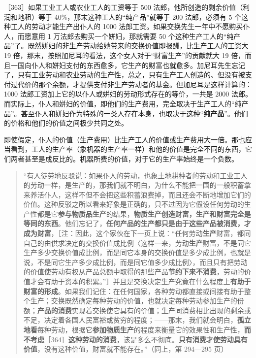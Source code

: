 ［363］如果工业工人或农业工人的工资等于 500 法郎，他所创造的剩余价值（利润和地租）等于 40\%，那末这种工人的“纯产品”就等于 200 法郎，必须有 5 个这种工人的劳动才能生产出仆人的 1000 法郎工资。如果交换先生一年中不愿购买仆人，而愿意用 1 万法郎去购买一个姘妇，那就需要 50 个这种生产工人的“纯产品”了。既然姘妇的非生产劳动给她带来的交换价值即报酬，比生产工人的工资大 19 倍，那末，按照加尼耳的看法，这个女人对于“财富生产”的贡献就大 19 倍，而且一国向仆人和姘妇支付的东西愈多，它生产的财富也就愈多。加尼耳先生忘记了，只有工业劳动和农业劳动的生产性，总之，只有生产工人创造的、但没有被支付过代价的那个余额，才提供支付非生产劳动者的基金。但加尼耳是这样计算的：1000 法郎工资加上它的以仆人或姘妇的劳动形式存在的等价，一共是 2000 法郎。而实际上，仆人和姘妇的价值，即他们的生产费用，完全取决于生产工人的“纯产品”。甚至仆人和姘妇作为特殊的一类人存在本身，也取决于这种“\textbf{纯产品}”。他们的价格和他们的价值之间极少共同之处。

即使假定，仆人的价值（生产费用）比生产工人的价值或生产费用大一倍。那也应当看到，工人的生产率（象机器的生产率一样）和他的价值是完全不同的东西，它们两者甚至是成反比的。机器所费的价值，对于它的生产率始终是一个负数。

\begin{quote}“有人徒劳地反驳说：如果仆人的劳动，也象土地耕种者的劳动和工业工人的劳动一样，是生产的，那我们就不明白，为什么不能把一国的一般积蓄拿来养活仆人，这样不但不会把这些积蓄浪费掉，而且还会不断地增加它们的价值。这种反驳之所以看来好象是正确的，只不过因为它假设任何劳动的生产性都是它\textbf{参与物质品生产}的结果，\textbf{物质生产创造财富，生产和财富完全是等同的东西}。他们忘记了，\textbf{任何产品的生产都只是由于这些产品被消费，才成为财富}，［注：\fontbox{~\{}因此，这个家伙在下一页上说：“任何劳动\textbf{生产}财富，都同自己的由供求决定的交换价值成比例〈这样一来，劳动\textbf{生产}财富，不是同它生产多少交换价值成比例，而是同它本身的交换价值是多少成比例，也就是说，不是同它生产多少成比例，而是同它值多少成比例〉，而且只有把劳动的价值使劳动有权从产品总额中取得的那些产品\textbf{节约下来不消费}，劳动的价值才会有助于资本的积累。”\fontbox{\}~}］并且是交换决定生产究竟在什么程度上\textbf{有助于财富的形成}。如果我们记住：在任何国家，各种劳动都直接或间接有助于整个生产；交换既然确定每种劳动的价值，也就决定每种劳动参加生产的份额；\textbf{产品的消费}实现着交换使它具有的价值；生产同消费相比出现的剩余或不足，决定着各国人民富裕或贫穷的程度；——那末，我们就会明白，\textbf{孤立地看}每种劳动，根据它\textbf{参加物质生产}的程度来衡量它的效果性和生产性，\textbf{而不考虑}［364］\textbf{这种劳动的消费}，该是多么不彻底。\textbf{只有消费才使劳动具有价值}，没有这种价值，财富就不能存在。”（同上，第 294—295 页）\end{quote}

